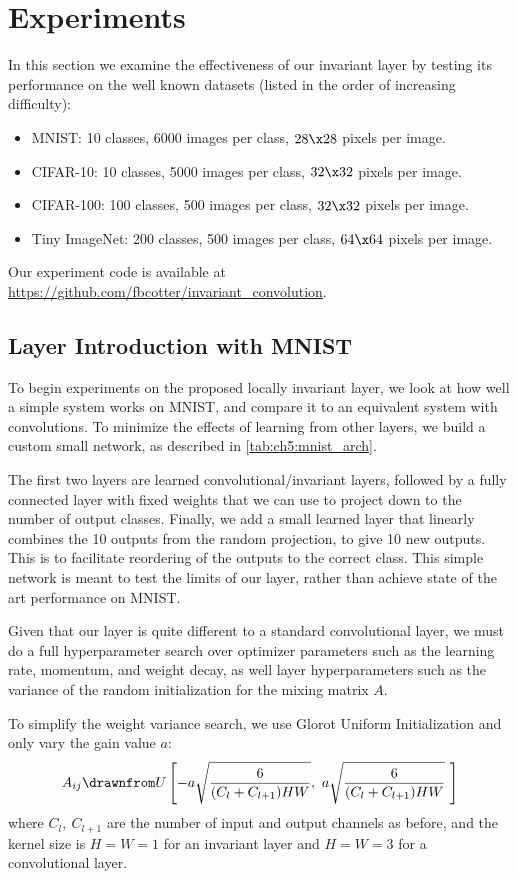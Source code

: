 \section{Experiments}\label{sec:experiments}
In this section we examine the effectiveness of our invariant layer by testing
its performance on the well known datasets (listed in the order of increasing
difficulty):
\begin{itemize}
  \item MNIST: 10 classes, 6000 images per class, $28\x 28$ pixels per image.
  \item CIFAR-10: 10 classes, 5000 images per class, $32\x 32$ pixels per image.
  \item CIFAR-100: 100 classes, 500 images per class, $32\x 32$ pixels per image. 
  \item Tiny ImageNet\cite{li_tiny_nodate}: 200 classes, 500 images per class, 
    $64 \x 64$ pixels per image. 
\end{itemize}
Our experiment code is available at
\url{https://github.com/fbcotter/invariant_convolution}.

\subsection{Layer Introduction with MNIST}\label{sec:ch5:mnist}
To begin experiments on the proposed locally invariant layer, we look at how
well a simple system works on MNIST, and compare it to an equivalent system with
convolutions. To minimize the effects of learning from other layers, we build a
custom small network, as described in \autoref{tab:ch5:mnist_arch}.

The first two layers are learned convolutional/invariant layers, followed by a fully connected 
layer with fixed weights that we can use to project down to the number of output
classes. Finally, we add a small learned layer that linearly combines the 10
outputs from the random projection, to give 10 new outputs. This is to
facilitate reordering of the outputs to the correct class. This simple network is
meant to test the limits of our layer, rather than achieve state of the art
performance on MNIST.

Given that our layer is quite different to a standard convolutional layer, we
must do a full hyperparameter search over optimizer parameters such as the
learning rate, momentum, and weight decay, as well layer hyperparameters 
such as the variance of the random initialization for the mixing matrix $A$.

To simplify the weight variance search, we use Glorot Uniform Initialization
\cite{glorot_understanding_2010} and only vary the gain value $a$:
%
\begin{equation}
  A_{ij} \drawnfrom U\left[ -a\sqrt{\frac{6}{(C_l + C_{l+1})HW}},\ a\sqrt{\frac{6}{(C_l + C_{l+1})HW}}\
  \right] \label{eq:ch5:glorot}
\end{equation}
%
where $C_l,\ C_{l+1}$ are the number of input and output channels as before, and
the kernel size is $H = W = 1$ for an invariant layer and $H = W= 3$ for a
convolutional layer.

